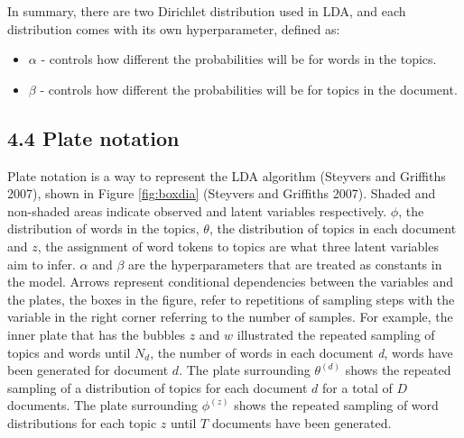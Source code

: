 \documentclass[
]{article}
\providecommand{\tightlist}{%
  \setlength{\itemsep}{0pt}\setlength{\parskip}{0pt}}
\begin{document}
In summary, there are two Dirichlet distribution used in LDA, and each
distribution comes with its own hyperparameter, defined as:

\begin{itemize}
\tightlist
\item
  \(\alpha\) - controls how different the probabilities will be for
  words in the topics.
\item
  \(\beta\) - controls how different the probabilities will be for
  topics in the document.
\end{itemize}

\hypertarget{plate-notation}{%
\subsection{4.4 Plate notation}\label{plate-notation}}

Plate notation is a way to represent the LDA algorithm (Steyvers and
Griffiths 2007), shown in Figure \ref{fig:boxdia} (Steyvers and
Griffiths 2007). Shaded and non-shaded areas indicate observed and
latent variables respectively. \(\phi\), the distribution of words in
the topics, \(\theta\), the distribution of topics in each document and
\(z\), the assignment of word tokens to topics are what three latent
variables aim to infer. \(\alpha\) and \(\beta\) are the hyperparameters
that are treated as constants in the model. Arrows represent conditional
dependencies between the variables and the plates, the boxes in the
figure, refer to repetitions of sampling steps with the variable in the
right corner referring to the number of samples. For example, the inner
plate that has the bubbles \(z\) and \(w\) illustrated the repeated
sampling of topics and words until \(N_d\), the number of words in each
document \emph{d}, words have been generated for document \(d\). The
plate surrounding \(\theta^{(d)}\) shows the repeated sampling of a
distribution of topics for each document \(d\) for a total of \(D\)
documents. The plate surrounding \(\phi^{(z)}\) shows the repeated
sampling of word distributions for each topic \(z\) until \(T\)
documents have been generated.
\end{document}
